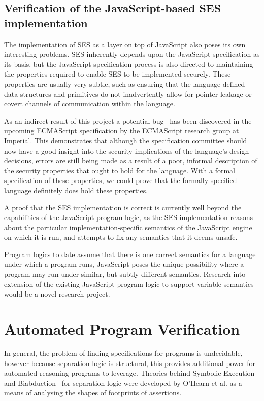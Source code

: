 \documentclass[a4paper,notitlepage]{report}
\begin{document}
\subsection{Verification of the JavaScript-based SES implementation}
The implementation of SES as a layer on top of JavaScript also poses its own
interesting problems. SES inherently depends upon the JavaScript specification
as its basis, but the JavaScript specification process is also directed to
maintaining the properties required to enable SES to be implemented securely.
These properties are usually very subtle, such as ensuring that the
language-defined data structures and primitives do not inadvertently allow for
pointer leakage or covert channels of communication within the language.

As an indirect result of this project a potential bug~\cite{es6-bug} has been discovered in the
upcoming ECMAScript specification by the ECMAScript research group at Imperial.
This demonstrates that although the
specification committee should now have a good insight into the security
implications of the language's design decisions, errors are still being made as
a result of a poor, informal description of the security properties that ought
to hold for the language. With a formal specification of these properties, we
could prove that the formally specified language definitely does hold these
properties.

A proof that the SES implementation is correct is currently well beyond the
capabilities of the JavaScript program logic, as the SES implementation reasons
about the particular implementation-specific semantics of the JavaScript engine
on which it is run, and attempts to fix any semantics that it deems unsafe.

Program logics to date assume that there is one correct semantics for a language
under which a program runs, JavaScript poses the unique possibility where a
program may run under similar, but subtly different semantics. Research into
extension of the existing JavaScript program logic to support variable semantics
would be a novel research project.

\section{Automated Program Verification}
In general, the problem of finding specifications for programs is undecidable, however because 
separation logic is structural, this provides additional power for automated
reasoning programs to leverage. Theories behind Symbolic
Execution~\cite{symb-exec} and
Biabduction~\cite{1480917} for separation logic were developed by O'Hearn et al.
as a means of analysing the shapes of footprints of assertions.
\end{document}
